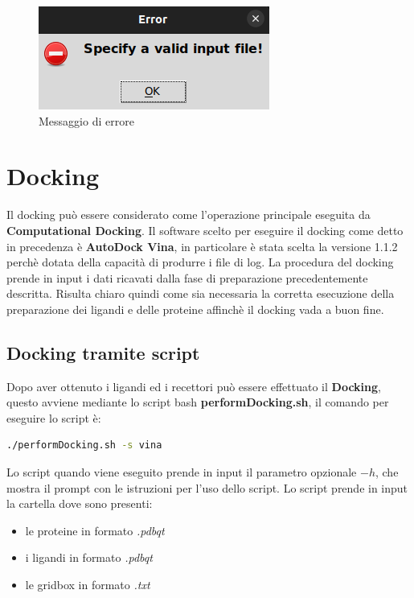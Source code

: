 \begin{figure}[H]
    \centering
    \includegraphics{immagini/capitolo3/invalidInputReceptors.png}
    \caption{Messaggio di errore}
    \label{fig:invalid input proteins}
\end{figure}

\section{Docking}
Il docking può essere considerato come l'operazione principale eseguita da \textbf{Computational Docking}. Il software scelto per eseguire il docking come detto in precedenza è \textbf{AutoDock Vina}, in particolare è stata scelta la versione 1.1.2 perchè dotata della capacità di produrre i file di log.\newline
La procedura del docking prende in input i dati ricavati dalla fase di preparazione precedentemente descritta. Risulta chiaro quindi come sia necessaria la corretta esecuzione della preparazione dei ligandi e delle proteine affinchè il docking vada a buon fine.

\subsection{Docking tramite script}
Dopo aver ottenuto i ligandi ed i recettori può essere effettuato il \textbf{Docking}, questo avviene mediante lo script bash \textbf{performDocking.sh}, il comando per eseguire lo script è:

\begin{lstlisting}[language=bash, label=lst:code29, caption={Comando per eseguire performDocking}]
./performDocking.sh -s vina
\end{lstlisting}

Lo script quando viene eseguito prende in input il parametro opzionale $-h$, che mostra il prompt con le istruzioni per l'uso dello script.\newline
Lo script prende in input la cartella dove sono presenti:

\begin{itemize}
    \item le proteine in formato \textit{.pdbqt}
    \item i ligandi in formato \textit{.pdbqt}
    \item le gridbox in formato \textit{.txt}
\end{itemize}


